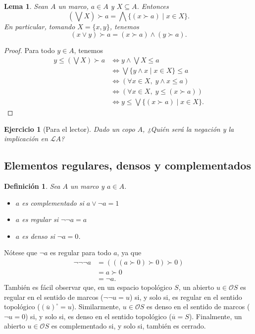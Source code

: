 \documentclass[12pt,letterpaper,titlepage]{article}
\newtheorem*{defn}{Definición}
\newtheorem{exe}{Ejercicio}
\newtheorem{lemma}{Lema}
\theoremstyle{definition}
\renewcommand\sup{\vee}
\newcommand\Sup{\bigvee}
\newcommand\ol[1]{\overline{#1}}
\renewcommand\inf{\wedge}
\newcommand\Inf{\bigwedge}
\renewcommand\cal[1]{\mathcal{#1}}
\newcommand\<{\langle}
\renewcommand\>{\rangle}
\begin{document}
\begin{lemma}
    Sean $A$ un marco, $a\in A$ y $X\subseteq A$.
    Entonces
    \[
        (\Sup X)\succ a = \Inf\{(x\succ a) \mid x\in X\}
    .\]
    En particular, tomando $X=\{x,y\}$, tenemos
    \[
        (x\sup y)\succ a = (x\succ a)\inf(y\succ a)
    .\]
\end{lemma}
\begin{proof}
    Para todo $y\in A$, tenemos
    \begin{align*}
        y\leq (\Sup X)\succ a
        &\iff y\inf \Sup X \leq a \\
        &\iff \Sup\{y\inf x\mid x\in X\} \leq a \\
        &\iff (\forall x\in X,\; y\inf x\leq a) \\
        &\iff (\forall x\in X,\; y\leq(x\succ a)) \\
        &\iff y\leq \Sup\{(x\succ a)\mid x\in X\}.
    \end{align*}
\end{proof}

\begin{exe}[Para el lector]%
  Dado un copo $A$,
  ¿Quién será la negación y la implicación en $\cal LA$?
\end{exe}

\subsection{Elementos regulares, densos y complementados}

\begin{defn}
  Sea $A$ un marco y $a\in A$.
  \begin{itemize}
    \item $a$ es complementado si $a\sup\neg a = 1$
    \item $a$ es regular si $\neg\neg a = a$
    \item $a$ es denso si $\neg a = 0$.
  \end{itemize}
\end{defn}

Nótese que $\neg a$ es regular para todo $a$, ya que
\begin{align*}
    \neg\neg\neg a
    &= (((a\succ 0)\succ 0)\succ 0) \\
    &=a\succ 0 \\
    &=\neg a.
\end{align*}
También es fácil observar que, en un espacio topológico $S$,
un abierto $u\in\cal OS$ es regular en el sentido de marcos
($\neg\neg u=u$) si, y solo si, es regular en el sentido
topológico ($(\ol u)^\circ=u$).
Similarmente, $u\in\cal OS$ es denso en el sentido de marcos
($\neg u=0$) si, y solo si, es denso en el sentido topológico
($\ol u=S$).
Finalmente, un abierto $u\in\cal OS$ es complementado si,
y solo si, también es cerrado.
\end{document}
